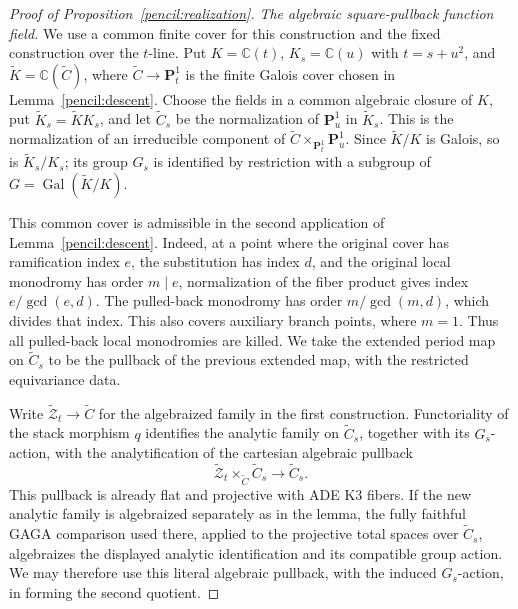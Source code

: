 \documentclass[11pt]{amsart}
\newcommand{\C}{\mathbb C}
\newcommand{\PP}{\mathbf P}
\theoremstyle{definition}
\theoremstyle{remark}
\numberwithin{equation}{section}
\begin{document}
\begin{proof}[Proof of Proposition~\ref{pencil:realization}]
\emph{The algebraic square-pullback function field.}
We use a common finite cover for this construction and the fixed
construction over the \(t\)-line.  Put \(K=\C(t)\),
\(K_s=\C(u)\) with \(t=s+u^2\), and
\(\widetilde K=\C(\widetilde C)\), where \(\widetilde C\to\PP^1_t\)
is the finite Galois cover chosen in Lemma~\ref{pencil:descent}.
Choose the fields in a common algebraic closure of \(K\), put
\(\widetilde K_s=\widetilde K K_s\), and let \(\widetilde C_s\) be the normalization of
\(\PP^1_u\) in \(\widetilde K_s\).  This is the normalization of an irreducible
component of \(\widetilde C\times_{\PP^1_t}\PP^1_u\).
Since \(\widetilde K/K\) is Galois, so is \(\widetilde K_s/K_s\); its group \(G_s\)
is identified by restriction with a subgroup of \(G=\operatorname{Gal}(\widetilde K/K)\).

This common cover is admissible in the second application of
Lemma~\ref{pencil:descent}.  Indeed, at a point where the original
cover has ramification index \(e\), the substitution has index \(d\),
and the original local monodromy has order \(m\mid e\), normalization
of the fiber product gives index \(e/\gcd(e,d)\).  The pulled-back
monodromy has order \(m/\gcd(m,d)\), which divides that index.
This also covers auxiliary branch points, where \(m=1\).
Thus all pulled-back local monodromies are killed.  We take the
extended period map on \(\widetilde C_s\) to be the pullback of the
previous extended map, with the restricted equivariance data.

Write \(\widetilde{\mathcal Z}_t\to\widetilde C\) for the
algebraized family in the first construction.  Functoriality of the
stack morphism \(q\) identifies the analytic family on
\(\widetilde C_s\), together with its \(G_s\)-action, with the
analytification of the cartesian algebraic pullback
\[
 \widetilde{\mathcal Z}_t\times_{\widetilde C}\widetilde C_s
       \longrightarrow \widetilde C_s.
\]
This pullback is already flat and projective with ADE K3 fibers.
If the new analytic family is algebraized separately as in the lemma,
the fully faithful GAGA comparison used there, applied to the
projective total spaces over \(\widetilde C_s\), algebraizes the
displayed analytic identification and its compatible group action.
We may therefore use this literal algebraic pullback,
with the induced \(G_s\)-action, in forming the second quotient.


\end{proof}
\end{document}
